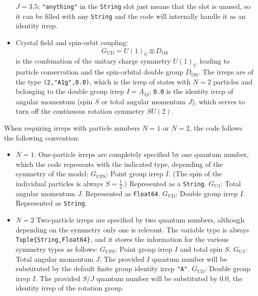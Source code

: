 \documentclass[notitlepage]{article}
\begin{document}
\begin{itemize}
        $J=3.5$; \texttt{"anything"} in the \texttt{String} slot 
        just means that the slot is unused,
        so it can be filled with any \texttt{String} and the
        code will internally handle it as an identity irrep.
    \item Crystal field and spin-orbit coupling:
        \begin{equation}
            G_\text{UD} =
            U(1)_\text{C} \otimes
            D_\text{OS}
        \end{equation}
        is the combination of the unitary charge symmetry
        $U(1)_\text{C}$ leading to particle conservation and
        the spin-orbital double group $D_\text{OS}$. 
        The irreps are of the type \texttt{(2,"A1g",0.0)}, which 
        is the irrep of states with $N=2$ particles
        and belonging to the double group irrep $I=A_{1g}$;
        \texttt{0.0} is the identity irrep of angular
        momentum (spin $S$ or total angular momentum $J$),
        which serves to turn off the continuous rotation
        symmetry $SU(2)$.
\end{itemize}
When requiring irreps with particle numbers $N=1$ or $N=2$,
the code follows the following convention:
\begin{itemize}
    \item $N=1$: One-particle irreps are completely
        specified by one quantum number, which the code
        represents with the indicated type, depending of the
        symmetry of the model:
        \subitem  $G_\text{UPS}$: Point group irrep $I$. (The
        spin of the individual particles is always
        $S=\frac{1}{2}$.) Represented as a \texttt{String}.
        \subitem $G_\text{UJ}$: Total angular momentum $J$.
        Represented as \texttt{Float64}.
        \subitem $G_\text{UD}$: Double group irrep $I$.
        Represented as \texttt{String}.
    \item $N=2$ Two-particle irreps are specified by two
        quantum numbers, although depending on the symmetry
        only one is relevant. The variable type is always
        \texttt{Tuple\{String,Float64\}}, and it stores
        the information for the various symmetry types as
        follows: 
        \subitem $G_\text{UPS}$: Point group irrep $I$ and
        total spin $S$.
        \subitem $G_\text{UJ}$: Total angular momentum $J$.
        The provided $I$ quantum number will be substituted
        by the default finite group identity irrep
        \texttt{"A"}.
        \subitem $G_\text{UD}$: Double group irrep $I$. The
        provided $S$/$J$ quantum number will be substituted
        by $0.0$, the identity irrep of the rotation group.
\end{itemize}
\end{document}
